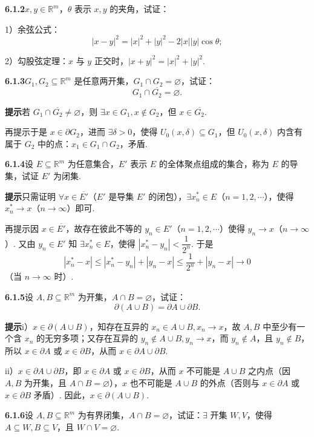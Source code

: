 \documentclass[UTF8,12pt,a4paper,fontset=fandol]{ctexart}
\begin{document}
\noindent\textbf{6.1.2}\quad $x,y\in\mathbb{R}^m$，$\theta$ 表示 $x,y$ 的夹角，试证：

1）余弦公式：
\[
  |x-y|^2=|x|^2+|y|^2-2|x||y|\cos\theta;
\]

2）勾股弦定理：$x$ 与 $y$ 正交时，$|x+y|^2=|x|^2+|y|^2$.

\noindent\textbf{6.1.3}\quad $G_1,G_2\subseteq\mathbb{R}^m$ 是任意两开集，$G_1\cap G_2=\varnothing$，试证：
\[
  G_1\cap\overline{G_2}=\varnothing.
\]

\noindent\textbf{提示}\quad 若 $G_1\cap\overline{G_2}\ne\varnothing$，则 $\exists x\in G_1,x\notin G_2$，但 $x\in\overline{G_2}$.

再提示\quad 于是 $x\in\partial G_2$，进而 $\exists\delta>0$，使得 $U_0(x,\delta)\subseteq G_1$，但 $U_0(x,\delta)$ 内含有属于 $G_2$ 中的点：$x_1\in G_1\cap G_2$，矛盾.

\noindent\textbf{6.1.4}\quad 设 $E\subseteq\mathbb{R}^m$ 为任意集合，$E'$ 表示 $E$ 的全体聚点组成的集合，称为 $E$ 的导集，试证 $E'$ 为闭集.

\noindent\textbf{提示}\quad 只需证明 $\forall x\in\overline{E'}$（$E'$ 是导集 $E'$ 的闭包），$\exists x_n^*\in E$（$n=1,2,\cdots$），使得 $x_n^*\to x$（$n\to\infty$）即可.

再提示\quad 因 $x\in\overline{E'}$，故存在彼此不等的 $y_n\in E'$（$n=1,2,\cdots$）使得 $y_n\to x$（$n\to\infty$）. 又由 $y_n\in E'$ 知 $\exists x_n^*\in E$，使得 $|x_n^*-y_n|<\dfrac1{2^n}$. 于是
\[
  |x_n^*-x|\le |x_n^*-y_n|+|y_n-x|\le\frac1{2^n}+|y_n-x|\to0
\]
（当 $n\to\infty$ 时）.

\noindent\textbf{6.1.5}\quad 设 $A,B\subseteq\mathbb{R}^m$ 为开集，$A\cap B=\varnothing$，试证：
\[
  \partial(A\cup B)=\partial A\cup\partial B.
\]

\noindent\textbf{提示}\quad i）$x\in\partial(A\cup B)$，知存在互异的 $x_n\in A\cup B,x_n\to x$，故 $A,B$ 中至少有一个含 $x_n$ 的无穷多项；又存在互异的 $y_n\notin A\cup B,y_n\to x$，而 $y_n\notin A$，且 $y_n\notin B$，所以 $x\in\partial A$ 或 $x\in\partial B$，从而 $x\in\partial A\cup\partial B$.

ii）$x\in\partial A\cup\partial B$，即 $x\in\partial A$ 或 $x\in\partial B$，从而 $x$ 不可能是 $A\cup B$ 之内点（因 $A,B$ 为开集，且 $A\cap B=\varnothing$），$x$ 也不可能是 $A\cup B$ 的外点（否则与 $x\in\partial A$ 或 $x\in\partial B$ 矛盾）. 因此，$x\in\partial(A\cup B)$.

\noindent\textbf{6.1.6}\quad 设 $A,B\subseteq\mathbb{R}^m$ 为有界闭集，$A\cap B=\varnothing$，试证：$\exists$ 开集 $W,V$，使得 $A\subseteq W,B\subseteq V$，且 $W\cap V=\varnothing$.
\end{document}
